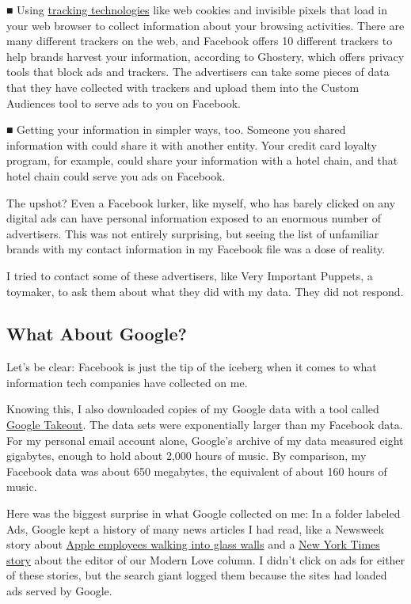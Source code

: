 ■ Using
\href{https://www.nytimes3xbfgragh.onion/2016/02/18/technology/personaltech/free-tools-to-keep-those-creepy-online-ads-from-watching-you.html}{tracking
technologies} like web cookies and invisible pixels that load in your
web browser to collect information about your browsing activities. There
are many different trackers on the web, and Facebook offers 10 different
trackers to help brands harvest your information, according to Ghostery,
which offers privacy tools that block ads and trackers. The advertisers
can take some pieces of data that they have collected with trackers and
upload them into the Custom Audiences tool to serve ads to you on
Facebook.

■ Getting your information in simpler ways, too. Someone you shared
information with could share it with another entity. Your credit card
loyalty program, for example, could share your information with a hotel
chain, and that hotel chain could serve you ads on Facebook.

The upshot? Even a Facebook lurker, like myself, who has barely clicked
on any digital ads can have personal information exposed to an enormous
number of advertisers. This was not entirely surprising, but seeing the
list of unfamiliar brands with my contact information in my Facebook
file was a dose of reality.

I tried to contact some of these advertisers, like Very Important
Puppets, a toymaker, to ask them about what they did with my data. They
did not respond.

\hypertarget{what-about-google}{%
\subsection{What About Google?}\label{what-about-google}}

Let's be clear: Facebook is just the tip of the iceberg when it comes to
what information tech companies have collected on me.

Knowing this, I also downloaded copies of my Google data with a tool
called \href{https://takeout.google.com/settings/takeout}{Google
Takeout}. The data sets were exponentially larger than my Facebook data.
For my personal email account alone, Google's archive of my data
measured eight gigabytes, enough to hold about 2,000 hours of music. By
comparison, my Facebook data was about 650 megabytes, the equivalent of
about 160 hours of music.

Here was the biggest surprise in what Google collected on me: In a
folder labeled Ads, Google kept a history of many news articles I had
read, like a Newsweek story about
\href{http://www.newsweek.com/apple-employees-call-911-walk-glass-walls-829998}{Apple
employees walking into glass walls} and a
\href{https://www.nytimes3xbfgragh.onion/2018/02/14/technology/personaltech/valentines-tech-couples-together.html}{New
York Times story} about the editor of our Modern Love column. I didn't
click on ads for either of these stories, but the search giant logged
them because the sites had loaded ads served by Google.

